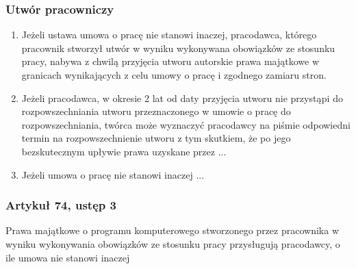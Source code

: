 \documentclass[12pt,a4paper]{article}
\begin{document}
\subsubsection{Utwór pracowniczy}
\begin{enumerate}
\item Jeżeli ustawa  umowa o pracę nie stanowi inaczej, pracodawca, którego pracownik stworzył utwór  w wyniku wykonywana obowiązków ze stosunku pracy, nabywa z chwilą przyjęcia utworu autorskie prawa majątkowe w granicach wynikających z celu umowy o pracę i zgodnego zamiaru stron.
\item Jeżeli pracodawca, w okresie 2 lat od daty przyjęcia utworu nie przystąpi do rozpowszechniania utworu przeznaczonego w umowie o pracę do rozpowszechniania, twórca może wyznaczyć pracodawcy na piśmie odpowiedni termin na rozpowszechnienie utworu z tym skutkiem, że po jego bezskutecznym upływie  prawa uzyskane przez ...
\item Jeżeli umowa o pracę nie stanowi inaczej ...
\end{enumerate}


\subsubsection{Artykuł 74, ustęp 3} 
 Prawa majątkowe o programu komputerowego stworzonego przez pracownika w wyniku wykonywania obowiązków ze stosunku pracy przysługują pracodawcy, o ile umowa nie stanowi inaczej 
\end{document}
